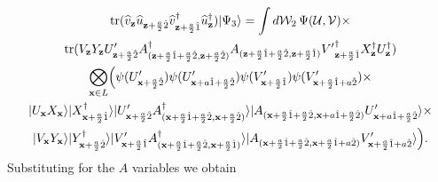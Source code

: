 \documentclass[12pt]{amsart}
\newcommand{\tr}{\operatorname{tr}}
\theoremstyle{definition}
\theoremstyle{remark}
\numberwithin{equation}{section}
\begin{document}
\begin{multline}	
	\tr(\widehat{v}_{\mathbf{z}}\widehat{u}_{\mathbf{z}+\frac{a}{2}\hat{2}}\widehat{v}^\dag_{\mathbf{z}+\frac{a}{2}\hat{1}}\widehat{u}_{\mathbf{z}}^\dag)|\Psi_3\rangle = \int  d\mathcal{W}_2 \, \Psi(\mathcal{U},\mathcal{V}) \times \\\tr(V_\mathbf{z} Y_\mathbf{z}U_{\mathbf{z}+\frac{a}{2}\hat{2}}' A_{(\mathbf{z}+\frac{a}{2}\hat{1}+\frac{a}{2}\hat{2}, \mathbf{z}+\frac{a}{2}\hat{2})}^\dag A_{(\mathbf{z}+\frac{a}{2}\hat{1}+\frac{a}{2}\hat{2}, \mathbf{z}+\frac{a}{2}\hat{1})}{V'}^\dag_{\mathbf{z}+\frac{a}{2}\hat{1}} X^\dag_\mathbf{z} U^\dag_\mathbf{z} )\\ \bigotimes_{\mathbf{x}\in L}\Bigl( \psi(U_{\mathbf{x}+\frac{a}{2}\hat{2}}')\psi(U_{\mathbf{x}+{a}\hat{1}+\frac{a}{2}\hat{2}}')\psi(V_{\mathbf{x}+\frac{a}{2}\hat{1}}')\psi(V_{\mathbf{x}+\frac{a}{2}\hat{1}+{a}\hat{2}}') \times\\ 
	|U_\mathbf{x} X_\mathbf{x}\rangle|X^\dag_{\mathbf{x}+\frac{a}{2}\hat{1}}\rangle |U_{\mathbf{x}+\frac{a}{2}\hat{2}}' A_{(\mathbf{x}+\frac{a}{2}\hat{1}+\frac{a}{2}\hat{2}, \mathbf{x}+\frac{a}{2}\hat{2})}^\dag   \rangle|A_{(\mathbf{x}+\frac{a}{2}\hat{1}+\frac{a}{2}\hat{2}, \mathbf{x}+{a}\hat{1}+\frac{a}{2}\hat{2})}U_{\mathbf{x}+{a}\hat{1}+\frac{a}{2}\hat{2}}'\rangle \times \\ 
	|V_\mathbf{x} Y_\mathbf{x}\rangle|Y^\dag_{\mathbf{x}+\frac{a}{2}\hat{2}}\rangle|V_{\mathbf{x}+\frac{a}{2}\hat{1}}'A_{(\mathbf{x}+\frac{a}{2}\hat{1}+\frac{a}{2}\hat{2}, \mathbf{x}+\frac{a}{2}\hat{1})}^\dag\rangle |A_{(\mathbf{x}+\frac{a}{2}\hat{1}+\frac{a}{2}\hat{2}, \mathbf{x}+\frac{a}{2}\hat{1}+{a}\hat{2})}V_{\mathbf{x}+\frac{a}{2}\hat{1}+{a}\hat{2}}'\rangle \Bigr).
\end{multline}
Substituting for the $A$ variables we obtain
\end{document}
